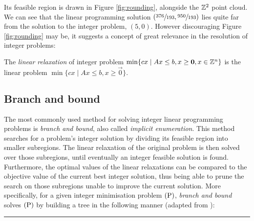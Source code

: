 \noindent
Its feasible region is drawn in Figure \ref{fig:rounding}, alongside the ${\mathbb{Z}}^2$
point cloud. We can see that the linear programming solution $(\sfrac{376}{193},
\sfrac{950}{193})$ lies quite far from the solution to the integer problem, $(5,
0)$. However discouraging Figure \ref{fig:rounding} may be, it suggests a
concept of great relevance in the resolution of integer problems:

\begin{definition}
    \label{def:linear-relaxation}
    
    The \emph{linear relaxation} of integer problem 
    $
        \min\{
            cx \mid Ax \leq b, x \geq {\mathbf{0}}, x \in {\ensuremath{\mathbb{Z}}}^n
        \}
    $
    is the linear problem
    $
        \min\{
            cx \mid Ax \leq b, x \geq \vec{0}
        \}
    $.
\end{definition}

\subsection{Branch and bound} %

The most commonly used method for solving integer linear programming problems is
\emph{branch and bound}, also called \emph{implicit enumeration}. This method
searches for a problem's integer solution by dividing its feasible region into
smaller subregions. The linear relaxation of the original problem is then solved
over those subregions, until eventually an integer feasible solution is found.
Furthermore, the optimal values of the linear relaxations can be compared to the
objective value of the current best integer solution, thus being able to prune
the search on those subregions unable to improve the current solution. More
specifically, for a given integer minimisation problem $\rm{(P)}$, \emph{branch
and bound} solves $\rm{(P)}$ by building a tree in the following manner
(adapted from \cite[Algorithm 7.2.1]{si:opt}):

\vspace{20pt}
\hrule

